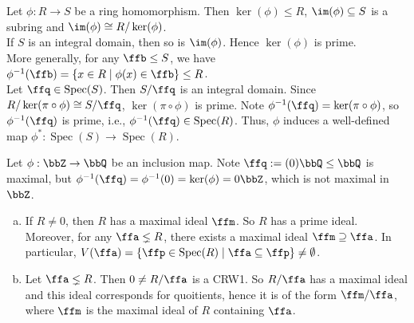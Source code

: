 \begin{fact}
    Let $\phi: R \to S$ be a ring homomorphism. Then $\ker(\phi) \leq R$, $\im(\phi) \subseteq S$ is a subring and $\im(\phi) \cong R/\ker(\phi)$. \\
    If $S$ is an integral domain, then so is $\im(\phi)$. Hence $\ker(\phi)$ is prime. \\
    More generally, for any $\ffb \leq S$, we have $\phi^{-1}(\ffb) = \{x \in R \mid \phi(x) \in \ffb\} \leq R$. \\
    Let $\ffq \in \operatorname{Spec}(S)$. Then $S/\ffq$ is an integral domain. Since $R/\ker(\pi \circ \phi) \cong S/\ffq$, $\ker(\pi \circ \phi)$ is prime. Note $\phi^{-1}(\ffq) = \ker(\pi \circ \phi)$, so $\phi^{-1}(\ffq)$ is prime, i.e., $\phi^{-1}(\ffq) \in \operatorname{Spec}(R)$. Thus, $\phi$ induces a well-defined map $\phi^*: \operatorname{Spec}(S) \to \operatorname{Spec}(R)$.
    \begin{center}
    \end{center}
\end{fact}

\begin{example*}
    Let $\phi: \bbZ \to \bbQ$ be an inclusion map. Note $\ffq := (0)\bbQ \leq \bbQ$ is maximal, but $\phi^{-1}(\ffq) = \phi^{-1}(0) = \ker(\phi) = 0 \bbZ$, which is not maximal in $\bbZ$. 
\end{example*}

\begin{fact}
    \begin{enumerate}[(a)]
        \item 
            If $R \neq 0$, then $R$ has a maximal ideal $\ffm$. So $R$ has a prime ideal. Moreover, for any $\ffa \lneq R$, there exists a maximal ideal $\ffm \supseteq \ffa$. In particular, $V(\ffa) = \{\ffp \in \operatorname{Spec}(R) \mid \ffa \subseteq \ffp\} \neq \emptyset$. 
        \item 
            Let $\ffa \lneq R$. Then $0 \neq R/\ffa$ is a CRW1. So $R/\ffa$ has a maximal ideal and this ideal corresponds for quoitients, hence it is of the form $\ffm/\ffa$, where $\ffm$ is the maximal ideal of $R$ containing $\ffa$.
    \end{enumerate}
\end{fact}

